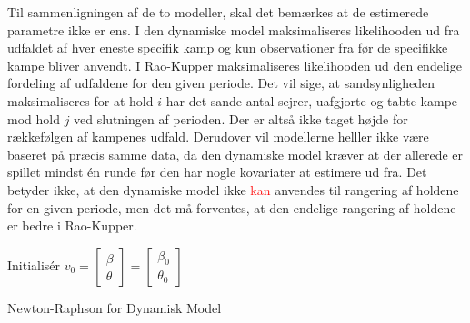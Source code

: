 \documentclass[11pt,a4paper]{article}
\begin{document}
Til sammenligningen af de to modeller, skal det bemærkes at de estimerede parametre ikke er ens. I den dynamiske model maksimaliseres likelihooden ud fra udfaldet af hver eneste specifik kamp og kun observationer fra før de specifikke kampe bliver anvendt. I Rao-Kupper maksimaliseres likelihooden ud den endelige fordeling af udfaldene for den given periode. Det vil sige, at sandsynligheden maksimaliseres for at hold $i$ har det sande antal sejrer, uafgjorte og tabte kampe mod hold $j$ ved slutningen af perioden. Der er altså ikke taget højde for rækkefølgen af kampenes udfald. Derudover vil modellerne helller ikke være baseret på præcis samme data, da den dynamiske model kræver at der allerede er spillet mindst én runde før den har nogle kovariater at estimere ud fra. Det betyder ikke, at den dynamiske model ikke \textcolor{red}{kan} anvendes til rangering af holdene for en given periode, men det må forventes, at den endelige rangering af holdene er bedre i Rao-Kupper.\\
\begin{algorithm}[H]
\SetAlgoLined
{}
 Initialisér $v_0 = \begin{bmatrix}
           \beta \\
           \theta
         \end{bmatrix} =\begin{bmatrix}
           \beta_0 \\
           \theta_0
         \end{bmatrix}\;$\\
\caption{Newton-Raphson for Dynamisk Model}\label{alg:Dynamisk}
\end{algorithm}
\end{document}
